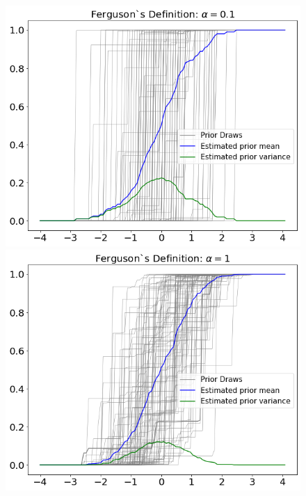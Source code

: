 \documentclass[a4paper, 10pt]{article}
\begin{document}
\begin{enumerate}
\begin{enumerate}
        
        \begin{center}
            \begin{figure}[h!]
                \centering
                \includegraphics[scale = 0.35]{b1.png}\\
                \includegraphics[scale = 0.35]{b2.png}

\end{figure}
\end{center}
\end{enumerate}
\end{enumerate}
\end{document}
